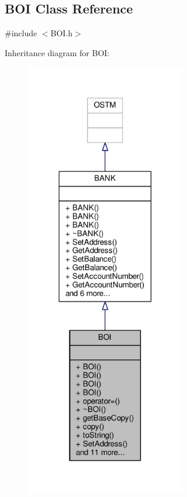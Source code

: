 \hypertarget{class_b_o_i}{}\subsection{B\+OI Class Reference}
\label{class_b_o_i}


{\ttfamily \#include $<$B\+O\+I.\+h$>$}



Inheritance diagram for B\+OI\+:
\nopagebreak
\begin{figure}[H]
\begin{center}
\leavevmode
\includegraphics[width=198pt]{class_b_o_i__inherit__graph}
\end{center}
\end{figure}


